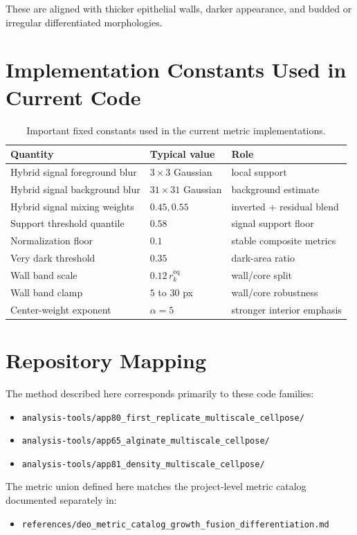 \documentclass[11pt]{article}
\newcommand{\1}{\mathbf{1}}
\begin{document}
These are aligned with thicker epithelial walls, darker appearance, and budded or irregular differentiated morphologies.

\section{Implementation Constants Used in Current Code}
\begin{table}[H]
\centering
\small
\begin{tabular}{@{}lll@{}}
\toprule
Quantity & Typical value & Role \\
\midrule
Hybrid signal foreground blur & $3\times3$ Gaussian & local support \\
Hybrid signal background blur & $31\times31$ Gaussian & background estimate \\
Hybrid signal mixing weights & $0.45, 0.55$ & inverted + residual blend \\
Support threshold quantile & $0.58$ & signal support floor \\
Normalization floor & $0.1$ & stable composite metrics \\
Very dark threshold & $0.35$ & dark-area ratio \\
Wall band scale & $0.12\,r_k^{\mathrm{eq}}$ & wall/core split \\
Wall band clamp & $5$ to $30$ px & wall/core robustness \\
Center-weight exponent & $\alpha=5$ & stronger interior emphasis \\
\bottomrule
\end{tabular}
\caption{Important fixed constants used in the current metric implementations.}
\end{table}

\section{Repository Mapping}
The method described here corresponds primarily to these code families:
\begin{itemize}[leftmargin=1.5em]
  \item \texttt{analysis-tools/app80\_first\_replicate\_multiscale\_cellpose/}
  \item \texttt{analysis-tools/app65\_alginate\_multiscale\_cellpose/}
  \item \texttt{analysis-tools/app81\_density\_multiscale\_cellpose/}
\end{itemize}

The metric union defined here matches the project-level metric catalog documented separately in:
\begin{itemize}[leftmargin=1.5em]
  \item \texttt{references/deo\_metric\_catalog\_growth\_fusion\_differentiation.md}
\end{itemize}
\end{document}
